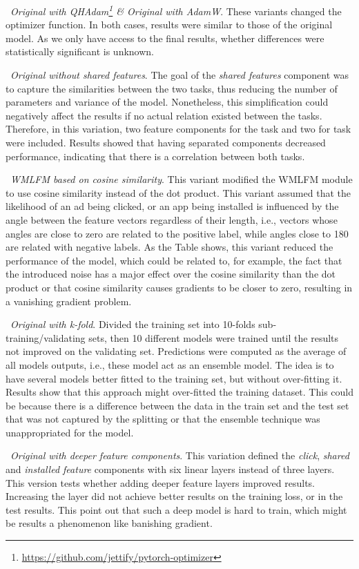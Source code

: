 \documentclass[manuscript,nonacm]{acmart}
\begin{document}
\noindent\textbullet~\textit{Original with QHAdam\footnote{\url{https://github.com/jettify/pytorch-optimizer}} \& Original with AdamW}. These variants changed the optimizer function. In both cases, results were similar to those of the original model. As we only have access to the final results, whether differences were statistically significant is unknown. 

\noindent\textbullet~\textit{Original without shared features}. The goal of the \textit{shared features} component was to capture the similarities between the two tasks, thus reducing the number of parameters and variance of the model. Nonetheless, this simplification could negatively affect the results if no actual relation existed between the tasks. Therefore, in this variation, two feature components for the  task and two for  task were included. Results showed that having separated components decreased performance, indicating that there is a correlation between both tasks.

\noindent\textbullet~\textit{WMLFM based on cosine similarity}. This variant modified the WMLFM module to use cosine similarity instead of the dot product. This variant assumed that the likelihood of an ad being clicked, or an app being installed is influenced by the angle between the feature vectors regardless of their length, i.e., vectors whose angles are close to zero are related to the positive label, while angles close to 180 are related with negative labels. As the Table shows, this variant reduced the performance of the model, which could be related to, for example, the fact that the introduced noise has a major effect over the cosine similarity than the dot product or that cosine similarity causes gradients to be closer to zero, resulting in a vanishing gradient problem.

\noindent\textbullet~\textit{Original with k-fold}. Divided the training set into 10-folds sub-training/validating sets, then 10 different models were trained until the results not improved on the validating set. Predictions were computed as the average of all models outputs, i.e., these model act as an ensemble model. The idea is to have several models better fitted to the training set, but without over-fitting it. Results show that this approach might over-fitted the training dataset. This could be because there is a difference between the data in the train set and the test set that was not captured by the splitting or that the ensemble technique was unappropriated for the model.

\noindent\textbullet~\textit{Original with deeper feature components}. This variation defined the \textit{click}, \textit{shared} and \textit{installed feature} components with six linear layers instead of three layers. This version tests whether adding deeper feature layers improved results. Increasing the layer did not achieve better results on the training loss, or in the test results. This point out that such a deep model is hard to train, which might be results a phenomenon like banishing gradient.
\end{document}
